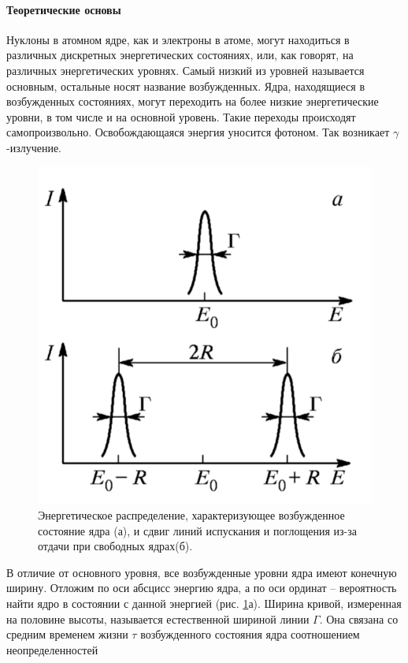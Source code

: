 \documentclass[a4paper, 12pt]{article}
\begin{document}
	\paragraph{Теоретические основы}
	Нуклоны в атомном ядре, как и электроны в атоме, могут находиться в различных дискретных энергетических состояниях, или, как говорят, на различных энергетических уровнях. Самый низкий из уровней называется основным, остальные носят название возбужденных. Ядра, находящиеся в возбужденных состояниях, могут переходить на более низкие энергетические уровни, в том числе и на основной уровень. Такие переходы происходят самопроизвольно. Освобождающаяся энергия уносится фотоном. Так  возникает $\gamma$-излучение.\par
	\begin{figure}
		\includegraphics[scale=0.2]{energy.png}
		\caption{Энергетическое распределение, характеризующее возбужденное состояние ядра (а), и сдвиг линий испускания и поглощения из-за отдачи при свободных ядрах(б).}
		\label{figT2}
	\end{figure}
	В отличие от основного уровня, все возбужденные уровни ядра имеют конечную ширину. Отложим по оси абсцисс энергию ядра, а по оси ординат – вероятность найти ядро в состоянии с данной энергией (рис. \ref{figT2}а). Ширина кривой, измеренная на половине высоты, называется естественной шириной линии $\Gamma$. Она связана со средним временем жизни $\tau$ возбужденного состояния ядра соотношением неопределенностей
\end{document}
